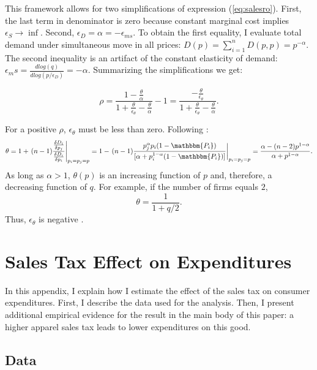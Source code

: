 \documentclass[12pt]{article}
\begin{document}
This framework allows for two simplifications of expression (\ref{eq:salesro}). First, the last term in denominator is zero because constant marginal cost implies $\epsilon_S \rightarrow \inf$. Second, $\epsilon_D=\alpha=-\epsilon_{ms}$. To obtain the first equality, I evaluate total demand under simultaneous move in all prices: $D(p)=\sum_{i=1}^{n}D(p, p)=p^{-\alpha}$. The second inequality is an artifact of the constant elasticity of demand: 
$\epsilon_ms=\frac{d log(q)}{d log(p/\epsilon_D)}=-\alpha$. 
Summarizing the simplifications we get:

\begin{equation}
\label{eq:poscon}
\rho= \frac{1-\frac{\theta}{\alpha}}{1+\frac{\theta}{\epsilon_\theta}-\frac{\theta}{\alpha}}-1=
\frac{-\frac{\theta}{\epsilon_\theta}}{1+\frac{\theta}{\epsilon_\theta}-\frac{\theta}{\alpha}}.
\end{equation}	

For a positive $\rho$, ${\epsilon_\theta}$ must be less than zero. Following \citep{fabinger}:
\begin{equation}
\label{eq:tht}
\theta=1+
\left.(n-1)\frac{\frac{\delta D_i}{\delta p_j}}{\frac{\delta D_i}{\delta p_i}}\right\vert_{p_i=p_j=p}
=1-\left.(n-1)\frac{p^{\alpha}_jp_i(1-\mathbbm{P_i})}{[\alpha + p^{1-\alpha}_i(1-\mathbbm{P_i})]}\right\vert_{p_i=p_j=p}=
\frac{\alpha-(n-2)p^{1-\alpha}}{\alpha+p^{1-\alpha}}.
\end{equation}	
As long as $\alpha>1$, $\theta(p)$ is an increasing function of $p$ and, therefore, a decreasing function of $q$.
For example, if the number of firms equals $2$, 
\begin{equation}
\label{eq:tht2}
\theta=\frac{1}{1+q/2}.
\end{equation}
Thus,  $\epsilon_\theta$ is negative . 



\section{Sales Tax Effect on Expenditures}
\label{app:ed}

	In this appendix, I explain how I estimate the effect of the sales tax on consumer expenditures. First, I describe the data used for the analysis. Then, I present additional empirical evidence for the result in the main body of this paper: a higher apparel sales tax leads to lower expenditures on this good.
	
	\subsection{Data}
	
\end{document}
